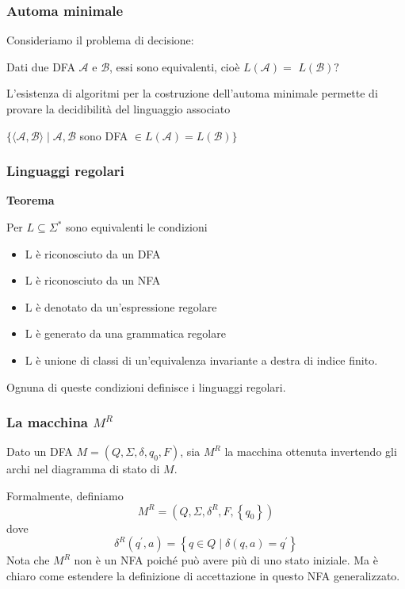 \subsubsection{Automa minimale}

Consideriamo il problema di decisione:

Dati due DFA $\mathcal{A}$ e $\mathcal{B}$, essi sono equivalenti, cioè $L(\mathcal{A})=$ $L(\mathcal{B}) ?$

L'esistenza di algoritmi per la costruzione dell'automa minimale permette di provare la decidibilità del linguaggio associato

$\{\langle\mathcal{A}, \mathcal{B}\rangle \mid \mathcal{A}, \mathcal{B}$ sono DFA $\in L(\mathcal{A})=L(\mathcal{B})\}$

\subsubsection{Linguaggi regolari}

\textbf{Teorema}

Per $L \subseteq \Sigma^{*}$ sono equivalenti le condizioni
\begin{itemize}
    \item L è riconosciuto da un DFA
    \item  L è riconosciuto da un NFA
    \item L è denotato da un'espressione regolare
    \item L è generato da una grammatica regolare
    \item L è unione di classi di un'equivalenza invariante a destra di indice finito.
\end{itemize}

Ognuna di queste condizioni definisce i linguaggi regolari.

\subsubsection{La macchina $M^R$}

Dato un DFA $M=\left(Q, \Sigma, \delta, q_{0}, F\right)$, sia $M^{R}$ la macchina ottenuta invertendo gli archi nel diagramma di stato di $M$.

Formalmente, definiamo
$$
M^{R}=\left(Q, \Sigma, \delta^{R}, F,\left\{q_{0}\right\}\right)
$$
dove
$$
\delta^{R}\left(q^{\prime}, a\right)=\left\{q \in Q \mid \delta(q, a)=q^{\prime}\right\}
$$
Nota che $M^{R}$ non è un NFA poiché può avere più di uno stato iniziale. Ma è chiaro come estendere la definizione di accettazione in questo NFA generalizzato.


